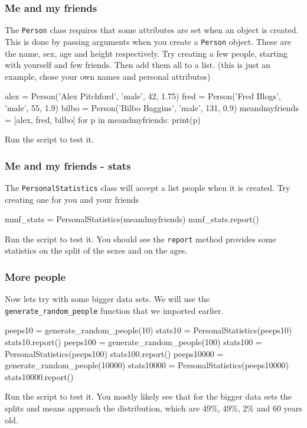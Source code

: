 \documentclass{beamer}
\begin{document}
\begin{frame}[fragile]
\frametitle{Me and my friends}
The \texttt{Person} class requires that some attributes are set when an object is created.
This is done by passing arguments when you create a \texttt{Person} object.
These are the name, sex, age and height respectively.
Try creating a few people, starting with yourself and few friends. 
Then add them all to a list. (this is just an example, chose your own names and personal attributes)

\begin{code} 
alex = Person('Alex Pitchford', 'male', 42, 1.75)
fred = Person('Fred Blogs', 'male', 55, 1.9)
bilbo = Person('Bilbo Baggins', 'male', 131, 0.9)
meandmyfriends = [alex, fred, bilbo]
for p in meandmyfriends:
    print(p)
\end{code}
Run the script to test it.

\end{frame}


\begin{frame}[fragile]
\frametitle{Me and my friends - stats}
The \texttt{PersonalStatistics} class will accept a list people when it is created.
Try creating one for you and your friends

\begin{code} 
mmf_stats = PersonalStatistics(meandmyfriends)
mmf_stats.report()
\end{code}
Run the script to test it.
You should see the \texttt{report} method provides some statistics 
on the split of the sexes and on the ages.

\end{frame}

\begin{frame}[fragile]
\frametitle{More people}
Now lets try with some bigger data sets. We will use the \texttt{generate\_random\_people}
function that we imported earlier.

\begin{code} 
peeps10 = generate_random_people(10)
stats10 = PersonalStatistics(peeps10)
stats10.report()
peeps100 = generate_random_people(100)
stats100 = PersonalStatistics(peeps100)
stats100.report()
peeps10000 = generate_random_people(10000)
stats10000 = PersonalStatistics(peeps10000)
stats10000.report()
\end{code}
Run the script to test it.
You mostly likely see that for the bigger data sets the splits and means approach the distribution, 
which are 49\%, 49\%, 2\% and 60 years old.

\end{frame}
\end{document}
